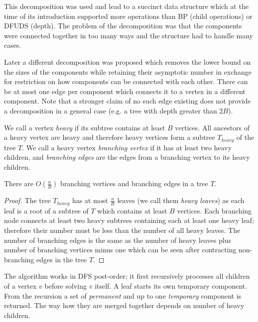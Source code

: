 This decomposition was used and lead to a succinct data structure which at the time of its introduction supported more operations than BP (child operations) or DFUDS (depth).
The problem of the decomposition was that the components were connected together in too many ways and the structure had to handle many cases.

Later a different decomposition was proposed which removes the lower bound on the sizes of the components while retaining their asymptotic number in exchange for restriction on how components can be connected with each other.
There can be at most one edge per component which connects it to a vertex in a different component.
Note that a stronger claim of no such edge existing does not provide a decomposition in a general case (e.g. a tree with depth greater than $2 B$).

We call a vertex \emph{heavy} if its subtree contains at least $B$ vertices.
All ancestors of a heavy vertex are heavy and therefore heavy vertices form a subtree $T_{heavy}$ of the tree $T$.
We call a heavy vertex \emph{branching vertex} if it has at least two heavy children, and \emph{branching edges} are the edges from a branching vertex to its heavy children.

\begin{lemma}
	There are $O\left(\frac{n}{B}\right)$ branching vertices and branching edges in a tree $T$.
\end{lemma}
\begin{proof}
	The tree $T_{heavy}$ has at most $\frac{n}{B}$ leaves (we call them \emph{heavy leaves}) as each leaf is a root of a subtree of $T$ which contains at least $B$ vertices.
	Each branching node connects at least two heavy subtrees containing each at least one heavy leaf; therefore their number must be less than the number of all heavy leaves.
	The number of branching edges is the same as the number of heavy leaves plus number of branching vertices minus one which can be seen after contracting non-branching edges in the tree $T$.
\end{proof}

The algorithm works in DFS post-order; it first recursively processes all children of a vertex $v$ before solving $v$ itself.
A leaf starts its own temporary component.
From the recursion a set of \emph{permanent} and up to one \emph{temporary} component is returned.
The way how they are merged together depends on number of heavy children.

